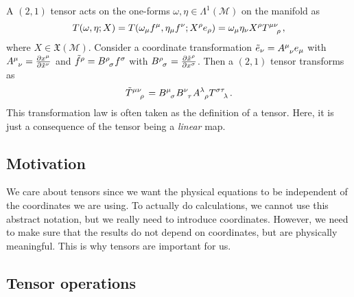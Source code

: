 \begin{example}[]
  A $(2,1)$ tensor acts on the one-forms $\omega, \eta \in \Lambda^1(\mathcal{M})$ on the manifold as
  \begin{equation}
    T(\omega, \eta; X) = T(\omega_\mu f^\mu, \eta_\mu f^\nu; X^\rho e_\rho) = \omega_\mu \eta_\nu X^\rho T \indices{^\mu ^\nu _\rho},
  \end{equation}
  where $X \in \mathfrak{X}(\mathcal{M})$. 
  Consider a coordinate transformation $\tilde e_\nu = A \indices{^\mu _\nu} e_\mu$ with $A \indices{^\mu _\nu} = \pdv{x^\mu}{ \tilde x^\nu}$ and $\tilde f^\rho = B \indices{ ^\rho _\sigma} f^\sigma$ with $B \indices{ ^\rho _\sigma} = \pdv{\tilde x ^\rho}{x^\sigma}$.
  Then a $(2, 1)$ tensor transforms as
  \begin{equation}
    \tilde T \indices{ ^\mu^\nu_\rho} = B \indices{^\mu_\sigma} B \indices{^\nu_\tau} A \indices{^\lambda_\rho} T \indices{^\sigma^\tau_\lambda}.
  \end{equation} 
  This transformation law is often taken as the definition of a tensor.
  Here, it is just a consequence of the tensor being a \emph{linear} map.
\end{example}

\subsection*{Motivation}%
\label{sub:motivation}

We care about tensors since we want the physical equations to be independent of the coordinates we are using.
To actually do calculations, we cannot use this abstract notation, but we really need to introduce coordinates.
However, we need to make sure that the results do not depend on coordinates, but are physically meaningful. This is why tensors are important for us.

\subsection{Tensor operations}%
\label{sub:tensor_operations}


